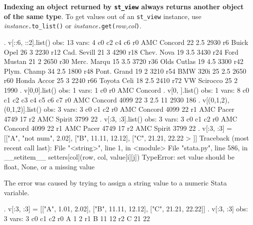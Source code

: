 \documentclass{article}
\begin{document}
\textbf{Indexing an object returned by \lstinline{st_view} always returns another object of the same type}. To get values out of an \lstinline{st_view} instance, use \textit{instance}\lstinline{.to_list()} or \textit{instance}\lstinline{.get(}\textit{row,col}\lstinline{)}.

\begin{stlog}
{\bftt{>>>}}. v[::6, ::2].list()
{\smallskip}
  obs: 13
 vars:  4
{\smallskip}
             c0        c2        c4        c6
 r0 AMC Concord        22       2.5      2930
 r6  Buick Opel        26         3      2230
r12 Cad. Sevill        21         3      4290
r18  Chev. Nova        19       3.5      3430
r24 Ford Mustan        21         2      2650
r30 Merc. Marqu        15       3.5      3720
r36 Olds Cutlas        19       4.5      3300
r42 Plym. Champ        34       2.5      1800
r48 Pont. Grand        19         2      3210
r54    BMW 320i        25       2.5      2650
r60 Honda Accor        25         3      2240
r66 Toyota Celi        18       2.5      2410
r72 VW Scirocco        25         2      1990
{\smallskip}
{\bftt{>>>}}. v[0,0].list()
{\smallskip}
  obs: 1
 vars: 1
{\smallskip}
            c0
r0 AMC Concord
{\smallskip}
{\bftt{>>>}}. v[0, ].list()
{\smallskip}
  obs: 1
 vars: 8
{\smallskip}
            c0       c1       c2       c3       c4       c5       c6       c7
r0 AMC Concord     4099       22        3      2.5       11     2930      186
{\smallskip}
{\bftt{>>>}}. v[(0,1,2), (0,1,2)].list()
{\smallskip}
  obs: 3
 vars: 3
{\smallskip}
            c0        c1        c2
r0 AMC Concord      4099        22
r1   AMC Pacer      4749        17
r2  AMC Spirit      3799        22
{\smallskip}
{\bftt{>>>}}. v[:3, :3].list()
{\smallskip}
  obs: 3
 vars: 3
{\smallskip}
            c0        c1        c2
r0 AMC Concord      4099        22
r1   AMC Pacer      4749        17
r2  AMC Spirit      3799        22
{\smallskip}
{\bftt{>>>}}. v[:3, :3] = [["A", "not num", 2.02], ["B", 11.11, 12.12], ["C", 21.21, 22.22
> ]]
{\color{red}Traceback (most recent call last):
  File "<string>", line 1, in <module>
  File "stata.py", line 586, in __setitem__
    setters[col](row, col, value[i][j])
TypeError: set value should be float, None, or a missing value}
\end{stlog}

\medskip

The error was caused by trying to assign a string value to a numeric Stata variable.

\begin{stlog}
{\bftt{>>>}}. v[:3, :3] = [["A", 1.01, 2.02], ["B", 11.11, 12.12], ["C", 21.21, 22.22]]
{\smallskip}
{\bftt{>>>}}. v[:3, :3]
{\smallskip}
  obs: 3
 vars: 3
{\smallskip}
            c0        c1        c2
r0           A         1         2
r1           B        11        12
r2           C        21        22
\end{stlog}
\end{document}
